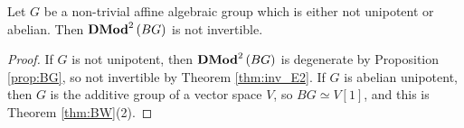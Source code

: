 \begin{cor}
\label{cor:BG_not_inv}
Let $G$ be a non-trivial affine algebraic group which is either not unipotent or abelian.
Then $\mathbf{DMod}^2\left(BG\right)$ is not invertible.
\end{cor}

\begin{proof}
If $G$ is not unipotent, then $\mathbf{DMod}^2\left(BG\right)$ is degenerate by Proposition
\ref{prop:BG}, so not invertible by Theorem \ref{thm:inv_E2}. If $G$ is abelian unipotent, then
$G$ is the additive group of a vector space $V$, so $BG\simeq V\left[1\right]$, and this is Theorem \ref{thm:BW}(2).
\end{proof}
